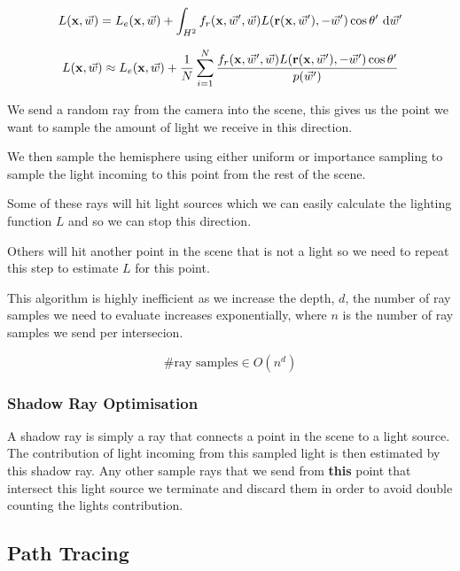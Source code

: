 \documentclass{article}
\begin{document}
\[
    L(\text{\textbf{x}}, \vec{w}) = L_e(\text{\textbf{x}}, \vec{w}) + \int_{H^2} f_r(\text{\textbf{x}}, \vec{w}', \vec{w}) L(\text{\textbf{r}}(\text{\textbf{x}}, \vec{w}'), -\vec{w}') \cos \theta' \ \text{d}\vec{w}'
\]

\[
    L(\text{\textbf{x}}, \vec{w}) \approx L_e(\text{\textbf{x}}, \vec{w}) + \frac{1}{N} \sum_{i=1}^{N} \frac{f_r(\text{\textbf{x}}, \vec{w}', \vec{w}) L(\text{\textbf{r}}(\text{\textbf{x}}, \vec{w}'), -\vec{w}') \cos \theta'}{p(\vec{w}')}
\]

We send a random ray from the camera into the scene, this gives us the point we want to sample the amount of light we receive in this direction.

\vspace{5px}

We then sample the hemisphere using either uniform or importance sampling to sample the light incoming to this point from the rest of the scene.

Some of these rays will hit light sources which we can easily calculate the lighting function \(L\) and so we can stop this direction.

Others will hit another point in the scene that is not a light so we need to repeat this step to estimate \(L\) for this point.

\vspace{10px}

This algorithm is highly inefficient as we increase the depth, \(d\), the number of ray samples we need to evaluate
increases exponentially, where \(n\) is the number of ray samples we send per intersecion.

\[
    \text{\#ray samples} \in O(n^d)
\]


\subsubsection{Shadow Ray Optimisation}

A shadow ray is simply a ray that connects a point in the scene to a light source. The contribution of light incoming from this sampled light
is then estimated by this shadow ray. Any other sample rays that we send from \textbf{this} point that intersect this light source we
terminate and discard them in order to avoid double counting the lights contribution.

\vspace{50px}

\subsection{Path Tracing}
\end{document}
